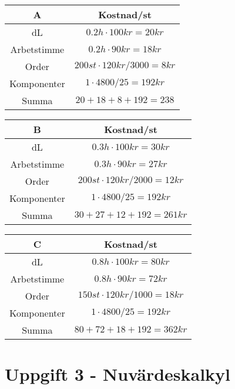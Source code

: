 \documentclass[a4paper, titlepage,12pt]{article}
\begin{document}
		\begin{center}
			\begin{tabular}{|c|c|}
				\hline
				\textbf{A} & \textbf{Kostnad/st} \\
				\hline
				dL & $0.2h \cdot 100kr = 20kr$ \\
				\hline
				Arbetstimme & $0.2h \cdot 90kr = 18kr$ \\
				\hline
				Order & $200st \cdot 120kr / 3000 = 8kr$ \\
				\hline
				Komponenter & $1 \cdot 4800 / 25 = 192kr$ \\
				\hline
				Summa & $20 + 18 + 8 + 192 = 238$ \\
				\hline
			\end{tabular}
		\end{center}

		\begin{center}
			\begin{tabular}{|c|c|}
				\hline
				\textbf{B} & \textbf{Kostnad/st} \\
				\hline
				dL & $0.3h \cdot 100kr = 30kr$ \\
				\hline
				Arbetstimme & $0.3h \cdot 90kr = 27kr$ \\
				\hline
				Order & $200st \cdot 120kr / 2000 = 12kr$ \\
				\hline
				Komponenter & $1 \cdot 4800 / 25 = 192kr$ \\
				\hline
				Summa & $30 + 27 + 12 + 192 = 261kr$ \\
				\hline
			\end{tabular}
		\end{center}

		\begin{center}
			\begin{tabular}{|c|c|}
				\hline
				\textbf{C} & \textbf{Kostnad/st} \\
				\hline
				dL & $0.8h \cdot 100kr = 80kr$ \\
				\hline
				Arbetstimme & $0.8h \cdot 90kr = 72kr$ \\
				\hline
				Order & $150st \cdot 120kr / 1000 = 18kr$ \\
				\hline
				Komponenter & $1 \cdot 4800 / 25 = 192kr$ \\
				\hline
				Summa & $80 + 72 + 18 + 192 = 362kr$ \\
				\hline
			\end{tabular}
		\end{center}

	\section*{Uppgift 3 - Nuvärdeskalkyl}
\end{document}
